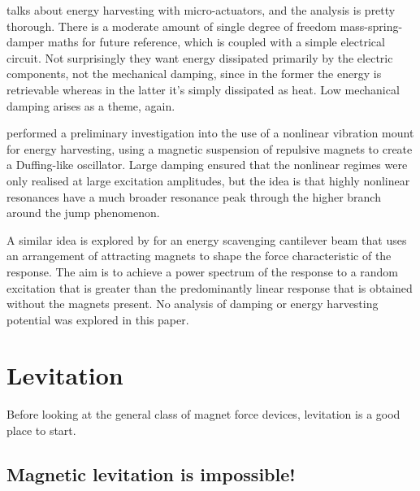 \textcite{stephen2006} talks about energy harvesting with micro-actuators, and
the analysis is pretty thorough. There is a moderate amount of single degree
of freedom mass-spring-damper maths for future reference, which is coupled
with a simple electrical circuit. Not surprisingly they want energy dissipated
primarily by the electric components, not the mechanical damping, since in the
former the energy is retrievable whereas in the latter it's simply dissipated
as heat. Low mechanical damping arises as a theme, again.

\textcite{mann2008} performed a preliminary investigation into the use of a
nonlinear vibration mount for energy harvesting, using a magnetic suspension
of repulsive magnets to create a Duffing-like oscillator. Large damping
ensured that the nonlinear regimes were only realised at large excitation
amplitudes, but the idea is that highly nonlinear resonances have a much
broader resonance peak through the higher branch around the jump phenomenon.

A similar idea is explored by \textcite{shahruz2008} for an energy scavenging
cantilever beam that uses an arrangement of attracting magnets to shape the
force characteristic of the response. The aim is to achieve a power spectrum
of the response to a random excitation that is greater than the predominantly
linear response that is obtained without the magnets present. No analysis of 
damping or energy harvesting potential was explored in this paper.


\section{Levitation}

Before looking at the general class of magnet force devices, levitation is a
good place to start.

\subsection{Magnetic levitation is impossible!}

